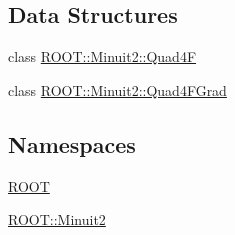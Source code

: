 \subsection*{Data Structures}
\begin{DoxyCompactItemize}
\item 
class \mbox{\hyperlink{classROOT_1_1Minuit2_1_1Quad4F}{R\+O\+O\+T\+::\+Minuit2\+::\+Quad4F}}
\item 
class \mbox{\hyperlink{classROOT_1_1Minuit2_1_1Quad4FGrad}{R\+O\+O\+T\+::\+Minuit2\+::\+Quad4\+F\+Grad}}
\end{DoxyCompactItemize}
\subsection*{Namespaces}
\begin{DoxyCompactItemize}
\item 
 \mbox{\hyperlink{namespaceROOT}{R\+O\+OT}}
\item 
 \mbox{\hyperlink{namespaceROOT_1_1Minuit2}{R\+O\+O\+T\+::\+Minuit2}}
\end{DoxyCompactItemize}

